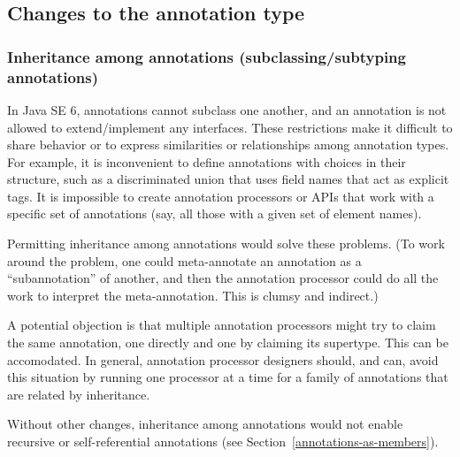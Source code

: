 \documentclass[10pt]{article}
\begin{document}
\subsection{Changes to the annotation type\label{changes-to-the-annotation-type}}


\subsubsection{Inheritance among annotations (subclassing/subtyping annotations)\label{inheritance-among-annotations}}


In Java SE 6, annotations cannot subclass one another, and an annotation is not allowed
to extend/implement any interfaces.  These restrictions make it difficult
to share behavior or to express similarities or relationships among
annotation types.  For example, it is inconvenient to define annotations
with choices in their structure, such as a discriminated union that uses
field names that act as explicit tags.  It is impossible to create
annotation processors or APIs that work with a specific set of annotations
(say, all those with a given set of element names).

Permitting inheritance among annotations would solve these problems.  (To
work around the problem, one could meta-annotate an annotation as a
``subannotation'' of another, and then the annotation processor could do
all the work to interpret the meta-annotation.  This is clumsy and
indirect.)

A potential objection is that multiple annotation processors might try to
claim the same annotation, one directly and one by claiming its supertype.
This can be accomodated.  In general, annotation processor designers
should, and can, avoid this situation by running one processor at a time
for a family of annotations that are related by inheritance.



Without other changes, inheritance among annotations would not enable
recursive or self-referential annotations (see
Section~\ref{annotations-as-members}).
\end{document}
